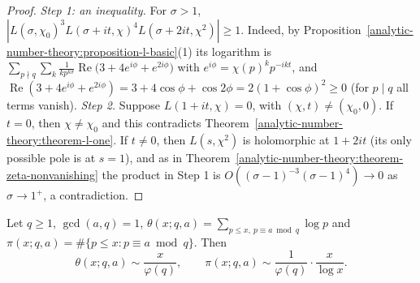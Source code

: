 \begin{proof}
\emph{Step 1: an inequality.} For $\sigma > 1$, $|L(\sigma, \chi_0)^3L(\sigma + it, \chi)^4L(\sigma + 2it, \chi^2)| \geq 1$. Indeed, by Proposition~\ref{analytic-number-theory:proposition-l-basic}(1) its
logarithm is $\sum_{p \nmid q}\sum_k\frac{1}{kp^{k\sigma}}\operatorname{Re}\bigl(3 + 4e^{i\phi} + e^{2i\phi}\bigr)$ with $e^{i\phi} = \chi(p)^kp^{-ikt}$, and
$\operatorname{Re}(3 + 4e^{i\phi} + e^{2i\phi}) = 3 + 4\cos\phi + \cos 2\phi = 2(1 + \cos\phi)^2 \geq 0$ (for $p \mid q$ all terms vanish).
\emph{Step 2.} Suppose $L(1 + it, \chi) = 0$, with $(\chi, t) \neq (\chi_0, 0)$. If $t = 0$, then $\chi \neq \chi_0$ and this contradicts Theorem~\ref{analytic-number-theory:theorem-l-one}. If $t \neq 0$,
then $L(s, \chi^2)$ is holomorphic at $1 + 2it$ (its only possible pole is at $s = 1$), and as in Theorem~\ref{analytic-number-theory:theorem-zeta-nonvanishing} the product in Step 1 is
$O((\sigma - 1)^{-3}(\sigma - 1)^4) \to 0$ as $\sigma \to 1^+$, a contradiction.
\end{proof}

\begin{theorem}\label{analytic-number-theory:theorem-pnt-progressions}
Let $q \geq 1$, $\gcd(a, q) = 1$, $\theta(x; q, a) = \sum_{p \leq x,\ p \equiv a \bmod q}\log p$ and $\pi(x; q, a) = \#\{p \leq x : p \equiv a \bmod q\}$. Then
\[
\theta(x; q, a) \sim \frac{x}{\varphi(q)}, \qquad \pi(x; q, a) \sim \frac{1}{\varphi(q)}\cdot\frac{x}{\log x}.
\]
\end{theorem}


